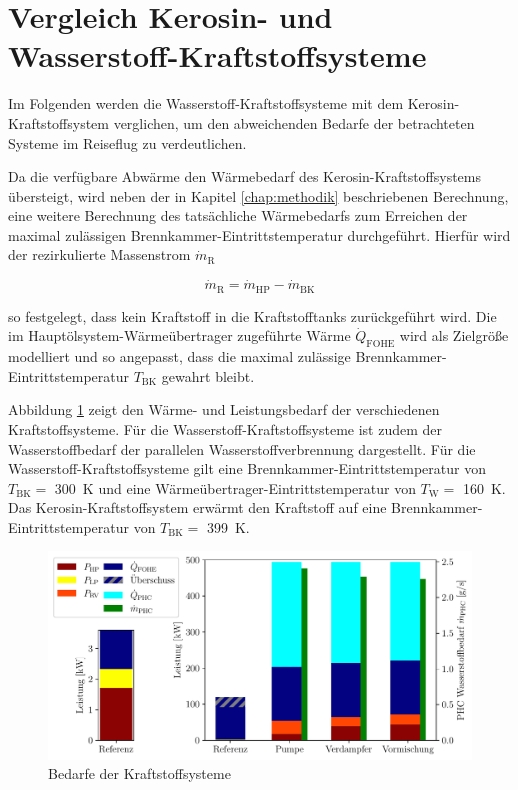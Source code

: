\section{Vergleich Kerosin- und Wasserstoff-Kraftstoffsysteme}

Im Folgenden werden die Wasserstoff-Kraftstoffsysteme mit dem Kerosin-Kraftstoffsystem verglichen, um den abweichenden Bedarfe der betrachteten Systeme im Reiseflug zu verdeutlichen. 

Da die verfügbare Abwärme den Wärmebedarf des Kerosin-Kraftstoffsystems übersteigt, wird neben der in Kapitel \ref{chap:methodik} beschriebenen Berechnung, eine weitere Berechnung des tatsächliche Wärmebedarfs zum Erreichen der maximal zulässigen Brennkammer-Eintrittstemperatur durchgeführt. Hierfür wird der rezirkulierte Massenstrom $\dot{m}_\mathrm{R}$

\begin{equation}
	 \dot{m}_\mathrm{R}=\dot{m}_\mathrm{HP}-\dot{m}_\mathrm{BK} 
\end{equation}
 
so festgelegt, dass kein Kraftstoff in die Kraftstofftanks zurückgeführt wird. Die im Hauptölsystem-Wärmeübertrager zugeführte Wärme $\dot{Q}_\mathrm{FOHE}$ wird als Zielgröße modelliert und so angepasst, dass die maximal zulässige Brennkammer-Eintrittstemperatur $T_\mathrm{BK}$ gewahrt bleibt.

Abbildung \ref{fig:refcomp} zeigt den Wärme- und Leistungsbedarf der verschiedenen Kraftstoffsysteme. Für die Wasserstoff-Kraftstoffsysteme ist zudem der Wasserstoffbedarf der parallelen Wasserstoffverbrennung dargestellt. Für die Wasserstoff-Kraftstoffsysteme gilt eine Brennkammer-Eintrittstemperatur von $T_\mathrm{BK}=$ \SI{300}{\K} und eine Wärmeübertrager-Eintrittstemperatur von $T_\mathrm{W}=$ \SI{160}{\K}. Das Kerosin-Kraftstoffsystem erwärmt den Kraftstoff auf eine Brennkammer-Eintrittstemperatur von $T_\mathrm{BK}=$ \SI{399}{\K}.

\begin{figure}[ht]
\centering
\includegraphics[width=1\linewidth]{4_Abbildungen/2_Hauptteil/Ergebnisse/refcomp.pdf}
  \caption{Bedarfe der Kraftstoffsysteme}
  \label{fig:refcomp}
\end{figure}
\FloatBarrier

